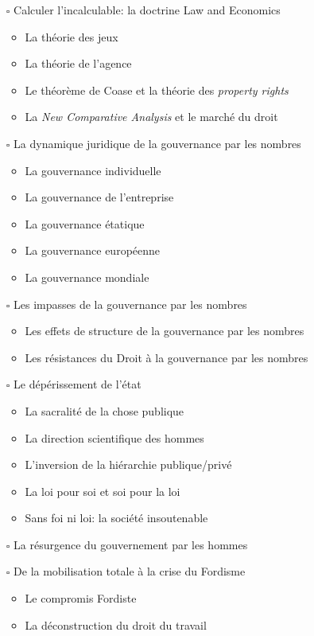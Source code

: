 \documentclass[paper=B6,portrait,twoside=true,twocolumn=false,headinclude=true,footinclude=false,fontsize=12,BCOR=10mm,DIV=calc,pagesize=auto,titlepage=firstiscover,mpinclude=false,headings=normal,headings=twolinechapter,open=right,toc=graduated,chapterprefix=false,numbers=endperiod,parskip=half+]{scrbook}
\theoremstyle{definition}
\begin{document}
\begin{itemize}
\begin{itemize}
\begin{itemize}
\end{itemize}
\item[{$\square$}] Calculer l'incalculable: la doctrine Law and Economics
\begin{itemize}
\item La théorie des jeux
\item La théorie de l'agence
\item Le théorème de Coase et la théorie des \emph{property rights}
\item La \emph{New Comparative Analysis} et le marché du droit
\end{itemize}
\item[{$\square$}] La dynamique juridique de la gouvernance par les nombres
\begin{itemize}
\item La gouvernance individuelle
\item La gouvernance de l’entreprise
\item La gouvernance étatique
\item La gouvernance européenne
\item La gouvernance mondiale
\end{itemize}
\item[{$\square$}] Les impasses de la gouvernance par les nombres
\begin{itemize}
\item Les effets de structure de la gouvernance par les nombres
\item Les résistances du Droit à la gouvernance par les nombres
\end{itemize}
\item[{$\square$}] Le dépérissement de l'état
\begin{itemize}
\item La sacralité de la chose publique
\item La direction scientifique des hommes
\item L'inversion de la hiérarchie publique/privé
\item La loi pour soi et soi pour la loi
\item Sans foi ni loi: la société insoutenable
\end{itemize}
\item[{$\square$}] La résurgence du gouvernement par les hommes
\item[{$\square$}] De la mobilisation totale à la crise du Fordisme
\begin{itemize}
\item Le compromis Fordiste
\item La déconstruction du droit du travail

\end{itemize}
\end{itemize}
\end{itemize}
\end{document}
